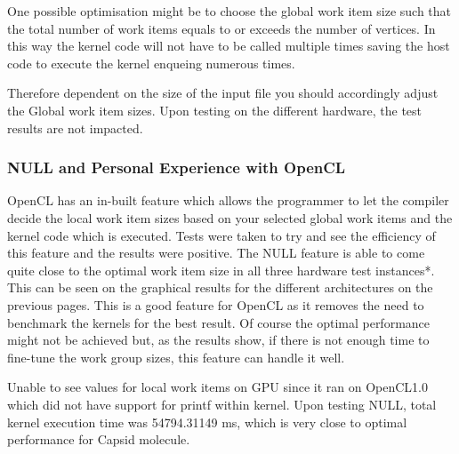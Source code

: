 \par{One possible optimisation might be to choose the global work 
    item size such that the total number of work items equals 
    to or exceeds the number of vertices. In this way the kernel 
    code will not have to be called multiple times saving the host code to 
    execute the kernel enqueing numerous times.}

\par{Therefore dependent on the size of the input file 
    you should accordingly adjust the Global work item sizes. 
    Upon testing on the different hardware, the test results 
    are not impacted.}

\subsubsection{NULL and Personal Experience with OpenCL}
\par{OpenCL has an in-built feature which allows the programmer to let the 
    compiler decide the local work item sizes based on your selected global 
    work items and the kernel code which is executed. Tests were taken to 
    try and see the efficiency of this feature and the results were positive. 
    The NULL feature is able to come quite close to the optimal work item 
    size in all three hardware test instances*. This can be seen on the 
    graphical results for the different architectures on the previous pages. 
    This is a good feature for OpenCL as it removes the need to benchmark 
    the kernels for the best result. Of course the optimal performance might 
    not be achieved but, as the results show, if there is not enough time to 
    fine-tune the work group sizes, this feature can handle it well.}

\par{Unable to see values for local work items on GPU since it 
    ran on OpenCL1.0 which did not have support for printf 
    within kernel. Upon testing NULL, total kernel execution 
    time was 54794.31149 ms, which is very close to optimal 
    performance for Capsid molecule.}


